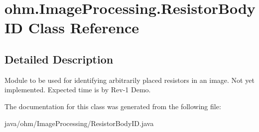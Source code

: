 \hypertarget{classohm_1_1_image_processing_1_1_resistor_body_i_d}{}\section{ohm.\+Image\+Processing.\+Resistor\+Body\+ID Class Reference}
\label{classohm_1_1_image_processing_1_1_resistor_body_i_d}


\subsection{Detailed Description}
Module to be used for identifying arbitrarily placed resistors in an image. Not yet implemented. Expected time is by Rev-\/1 Demo. 

The documentation for this class was generated from the following file\+:\begin{DoxyCompactItemize}
\item 
java/ohm/\+Image\+Processing/Resistor\+Body\+I\+D.\+java\end{DoxyCompactItemize}
